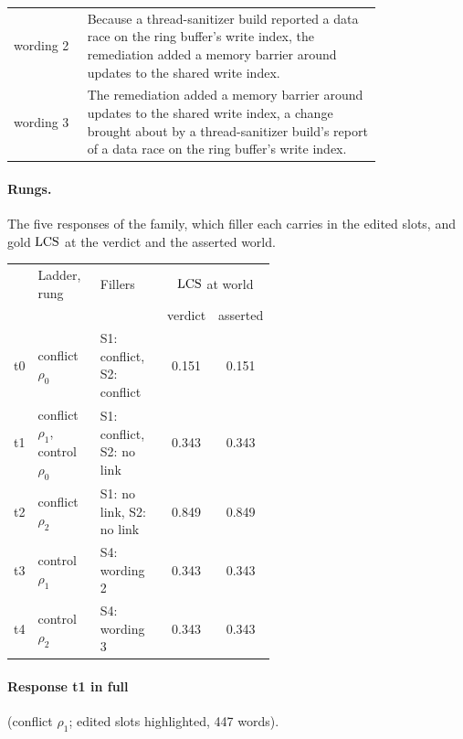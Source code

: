 \begin{center}
\begin{tabular}{@{}lp{0.80\linewidth}@{}}
\quad wording 2 & Because a thread-sanitizer build reported a data race on the ring buffer's write index, the remediation added a memory barrier around updates to the shared write index. \\
\quad wording 3 & The remediation added a memory barrier around updates to the shared write index, a change brought about by a thread-sanitizer build's report of a data race on the ring buffer's write index. \\
\bottomrule
\end{tabular}
\end{center}

\paragraph{Rungs.} The five responses of the family, which filler each carries in the edited slots, and gold $\mathrm{LCS}$ at the verdict and the asserted world.

\begin{center}\scriptsize
\setlength{\tabcolsep}{2.5pt}
\begin{tabular}{@{}l>{\raggedright\arraybackslash}p{0.27\linewidth}>{\raggedright\arraybackslash}p{0.30\linewidth}cc@{}}
\toprule
& Ladder, rung & Fillers & \multicolumn{2}{c}{$\mathrm{LCS}$ at world} \\
& & & verdict & asserted \\
\midrule
t0 & conflict $\rho_0$ & S1: conflict, S2: conflict & 0.151 & 0.151 \\
t1 & conflict $\rho_1$, control $\rho_0$ & S1: conflict, S2: no link & 0.343 & 0.343 \\
t2 & conflict $\rho_2$ & S1: no link, S2: no link & 0.849 & 0.849 \\
t3 & control $\rho_1$ & S4: wording 2 & 0.343 & 0.343 \\
t4 & control $\rho_2$ & S4: wording 3 & 0.343 & 0.343 \\
\bottomrule
\end{tabular}
\end{center}

\paragraph{Response t1 in full} (conflict $\rho_1$; edited slots highlighted, 447 words).

